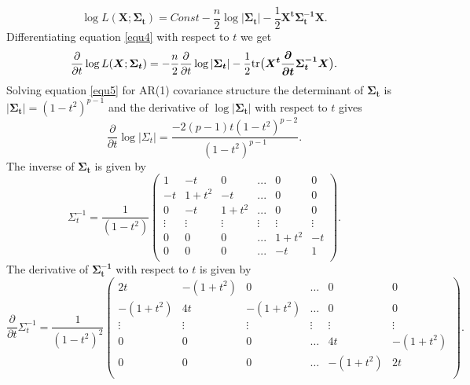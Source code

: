  \begin{equation}
 \log L(\boldsymbol{X};\boldsymbol{\Sigma_{t}})= Const - \frac{n}{2} \log\left|\boldsymbol{\Sigma_{t}}\right|-\frac{1}{2}\boldsymbol{X^t \Sigma_{t}^{-1} X}.
 \label{equ4}
 \end{equation}
Differentiating equation \ref{equ4} with respect to $t$ we get
 \begin{equation}
 \frac{\partial}{\partial t} \log L(\boldsymbol{X};\boldsymbol{\Sigma_{t}}) = - \frac{n}{2} \frac{\partial}{\partial t} \log\left|\boldsymbol{\Sigma_{t}}\right|-\frac{1}{2} \tr \big ( \boldsymbol{X^t \frac{\partial}{\partial t} \Sigma_{t}^{-1} X} \big ).
  \label{equ5}
 \end{equation}
  Solving equation \ref{equ5} for AR(1) covariance structure the determinant of $\boldsymbol{\Sigma_{t}}$ is $\boldsymbol{|\Sigma_{t}|} = (1- t^2)^{p-1} $ and the derivative of $\log\left|\boldsymbol{\Sigma_{t}}\right|$ with respect to $t$ gives
  \begin{equation}
  \frac{\partial}{\partial t} \log |\Sigma_{t}|= \frac{-2(p-1)t(1-t^2)^{p-2}}{(1-t^2)^{p-1}}.
  \label{equ6}
  \end{equation}
The inverse of $\boldsymbol{\Sigma_{t}}$ is given by
\begin{equation*}
\Sigma_{t}^{-1}= \frac{1}{(1-t^2)}
  \begin{pmatrix}
    1 & -t & 0 & ... & 0 & 0 \\
    -t & 1+t^2 & -t & ... & 0 & 0 \\
    0 & -t & 1+t^2 & ... & 0 & 0 \\
    \vdots   & \vdots & \vdots &  \vdots &   \vdots & \vdots\\
    0 & 0 & 0 & ... & 1+t^2 & -t  \\
    0 & 0 & 0 & ... & -t & 1 \\
  \end{pmatrix}.
\end{equation*}
The derivative of $ \boldsymbol{\Sigma_{t}^{-1}}$ with respect to $t$ is given by
   \begin{equation*}
\frac{\partial}{\partial t} \Sigma_{t}^{-1}= \frac{1}{(1-t^2)^2}
  \begin{pmatrix}
    2t & -(1+t^2) & 0 & \hdots & 0 & 0 \\
    -(1+t^2) & 4t & -(1+t^2) & \hdots & 0 & 0 \\
    \vdots & \vdots & \vdots & \vdots & \vdots & \vdots \\
    0 & 0 & 0 & \hdots & 4t & -(1+t^2)  \\
    0 & 0 & 0 & \hdots & -(1+t^2) & 2t \\
  \end{pmatrix}.  
  \end{equation*}
